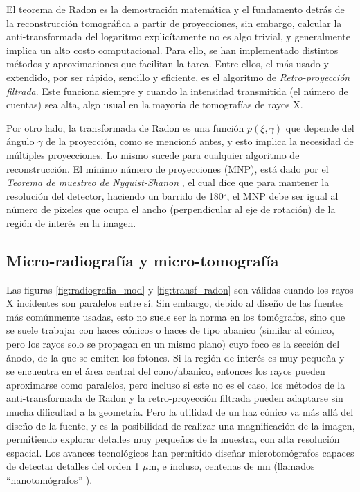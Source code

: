 

El teorema de Radon es la demostración matemática y el fundamento detrás de la reconstrucción
tomográfica a partir de proyecciones, sin embargo, calcular la anti-trans\-for\-ma\-da
del logaritmo explicítamente no es algo trivial, y generalmente implica un alto
costo computacional. Para ello, se han implementado distintos métodos y aproximaciones
que facilitan la tarea. Entre ellos, el más usado y extendido, por ser rápido,
sencillo y eficiente, es el algoritmo de \textit{Retro-proyección filtrada}. Este
funciona siempre y cuando la intensidad transmitida (el número de cuentas) sea 
alta, algo usual en la mayoría de tomografías de rayos X. \cite{Stock2019}\cite{Als-Nielsen2011}

Por otro lado, la transformada de Radon es una función $p(\xi,\gamma)$ que depende del ángulo
$\gamma$ de la proyección, como se mencionó antes, y esto implica la necesidad de múltiples
proyecciones. Lo mismo sucede para cualquier algoritmo de reconstrucción.
El mínimo número de proyecciones (MNP), está dado por el \textit{Teorema de muestreo
de Nyquist-Shanon} \cite{Nyquist}, el cual dice que para mantener la resolución del detector, haciendo
un barrido de 180$^{\circ}$, el MNP debe ser igual al número de pixeles que ocupa el ancho
(perpendicular al eje de rotación) de la región de interés en la imagen.

\subsection{Micro-radiografía y micro-tomografía}

Las figuras \ref{fig:radiografia_mod} y \ref{fig:transf_radon} son válidas cuando
los rayos X incidentes son paralelos entre sí. Sin embargo, debido al diseño de
las fuentes más comúnmente usadas, esto no suele ser la norma en los tomógrafos, sino que se suele trabajar
con haces cónicos o haces de tipo abanico (similar al cónico, pero los rayos solo
se propagan en un mismo plano) cuyo foco es la sección del ánodo, de la que se emiten los fotones.
Si la región de interés es muy pequeña y se encuentra
en el área central del cono/abanico, entonces los rayos pueden aproximarse como
paralelos, pero incluso si este no es el caso, los métodos de la anti-transformada
de Radon y la retro-proyección filtrada pueden adaptarse sin mucha dificultad a
la geometría. Pero la utilidad de un haz cónico va más allá del diseño de la fuente,
y es la posibilidad de realizar una magnificación de la imagen, permitiendo explorar
detalles muy pequeños de la muestra, con alta resolución espacial. Los avances
tecnológicos han permitido diseñar microtomógrafos capaces de detectar detalles
del orden 1 $\mu$m, e incluso, centenas de nm (llamados ``nanotomógrafos'' \cite{Claro2023}).


